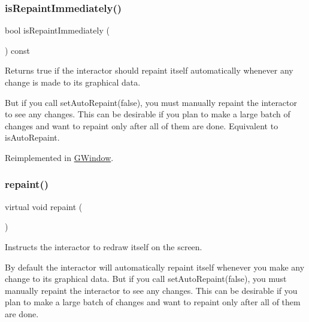 \mbox{\label{classGDrawingSurface_a82a00267c81cc0ae85ee0feb01a92fa8}} 
\subsubsection{\texorpdfstring{is\+Repaint\+Immediately()}{isRepaintImmediately()}}
{\footnotesize\ttfamily bool is\+Repaint\+Immediately (\begin{DoxyParamCaption}{ }\end{DoxyParamCaption}) const\hspace{0.3cm}{\ttfamily [virtual]}}



Returns true if the interactor should repaint itself automatically whenever any change is made to its graphical data. 

But if you call set\+Auto\+Repaint(false), you must manually repaint the interactor to see any changes. This can be desirable if you plan to make a large batch of changes and want to repaint only after all of them are done. Equivalent to is\+Auto\+Repaint. 

Reimplemented in \mbox{\hyperlink{classGWindow_ae88344ee919d3d3de6e38a8381faf209}{G\+Window}}.

\mbox{\label{classGDrawingSurface_a4a8ae47b42f1e6a41b65d3546df46218}} 
\subsubsection{\texorpdfstring{repaint()}{repaint()}}
{\footnotesize\ttfamily virtual void repaint (\begin{DoxyParamCaption}{ }\end{DoxyParamCaption})\hspace{0.3cm}{\ttfamily [pure virtual]}}



Instructs the interactor to redraw itself on the screen. 

By default the interactor will automatically repaint itself whenever you make any change to its graphical data. But if you call set\+Auto\+Repaint(false), you must manually repaint the interactor to see any changes. This can be desirable if you plan to make a large batch of changes and want to repaint only after all of them are done. 

